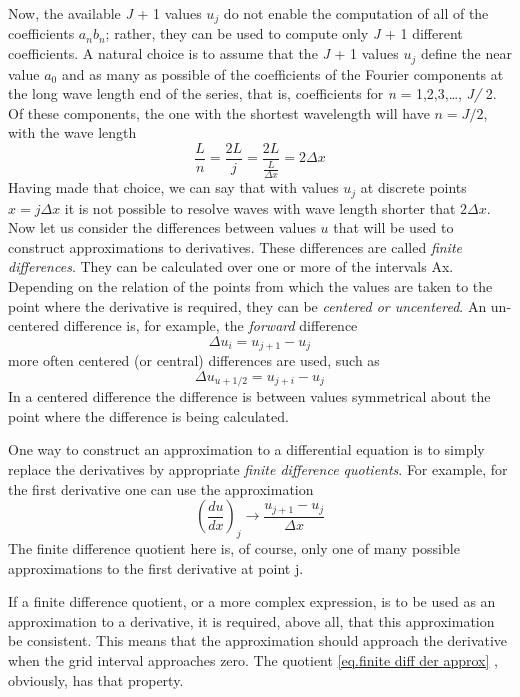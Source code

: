 Now, the available \textit{J} + 1 values $u_j$ do not enable the computation of all of the coefficients $a_nb_n$; rather, they can be used to compute only \textit{J} + 1 different coefficients. A natural choice is to assume that the \textit{J} + 1 values $u_j$ define the near value $a_0$ and as many as possible of the coefficients of the Fourier components at the long wave length end of the series, that is, coefficients for \textit{n} = 1,2,3,…, \textit{J/} 2. Of these components, the one with the shortest wavelength will have $n=J/2$, with the wave length
$$\frac{L}{n}=\frac{2L}{j}=\frac{2L}{\frac{L}{\Delta x}}=2\Delta x$$
Having made that choice, we can say that with values $u_j$ at discrete points $x=j\Delta x$ it is not possible to resolve waves with wave length shorter that $2\Delta x$.
Now let us consider the differences between values $u$ that will be used to construct approximations to derivatives. These differences are called \textit{finite differences}. They can be calculated over one or more of the intervals Ax. Depending on the relation of the points from which the values are taken to the point where the derivative is required, they can be \textit{centered or uncentered}. An un-centered difference is, for example, the \textit{forward} difference
\begin{equation}\label{eq: forward difference}
	\Delta u_i=u_{j+1}-u_j
\end{equation}
more often centered (or central) differences are used, such as
\begin{equation}
	\Delta u_{u+1/2}=u_{j+i}-u_j
\end{equation}
In a centered difference the difference is between values symmetrical about the point where the difference is being calculated.

One way to construct an approximation to a differen­tial equation is to simply replace the derivatives by appro­priate \textit{finite difference quotients}. For example, for the first derivative one can use the approximation
\begin{equation}\label{eq.finite diff der approx}
	\left(\frac{du}{dx}\right)_j\rightarrow\frac{u_{j+1}-u_j}{\Delta x}
\end{equation}
The finite difference quotient here is, of course, only one of many possible approximations to the first derivative at point j.

If a finite difference quotient, or a more complex expression, is to be used as an approximation to a deri­vative, it is required, above all, that this approximation be consistent. This means that the approximation should approach the derivative when the grid interval approaches zero. The quotient \ref{eq.finite diff der approx} , obviously, has that property.

